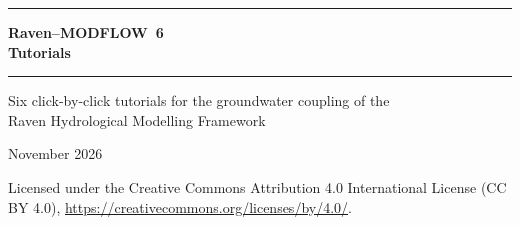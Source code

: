 \begin{titlepage}
\centering
\vspace*{3.5cm}
{\color{brand}\rule{\linewidth}{1.2pt}}\par\vspace{16pt}
{\sffamily\bfseries\fontsize{30}{38}\selectfont\color{brand}Raven--MODFLOW~6\\[4pt]Tutorials\par}
\vspace{14pt}
{\color{brand}\rule{\linewidth}{1.2pt}}\par\vspace{24pt}
{\large Six click-by-click tutorials for the groundwater coupling of the\\[2pt]Raven Hydrological Modelling Framework\par}
\vfill
{\large November 2026\par}
\vspace{1.2cm}
{\footnotesize\color{gray!70!black}Licensed under the Creative Commons Attribution 4.0 International License (CC BY 4.0),
\url{https://creativecommons.org/licenses/by/4.0/}.\par}
\end{titlepage}
\renewcommand{\tutheader}{Raven--MODFLOW~6 tutorials}
\begingroup\small\tableofcontents\endgroup
